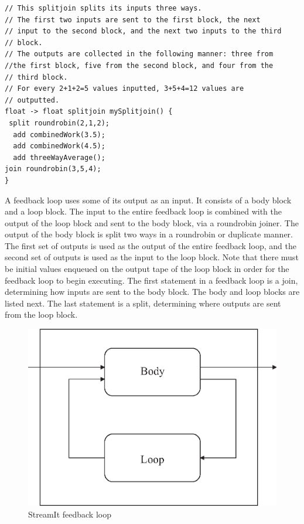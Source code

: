 \begin{scriptsize}
\begin{verbatim}
// This splitjoin splits its inputs three ways.
// The first two inputs are sent to the first block, the next
// input to the second block, and the next two inputs to the third
// block.
// The outputs are collected in the following manner: three from
//the first block, five from the second block, and four from the
// third block.
// For every 2+1+2=5 values inputted, 3+5+4=12 values are
// outputted.
float -> float splitjoin mySplitjoin() {
 split roundrobin(2,1,2);
  add combinedWork(3.5);
  add combinedWork(4.5);
  add threeWayAverage();
join roundrobin(3,5,4);
}
\end{verbatim}
\end{scriptsize}

    A feedback loop uses some of its output as
an input. It consists of a body block and a loop block. The input
to the entire feedback loop is combined with the output of the
loop block and sent to the body block, via a roundrobin joiner.
The output of the body block is split two ways in a roundrobin or
duplicate manner.  The first set of outputs is used as the output
of the entire feedback loop, and the second set of outputs is used
as the input to the loop block. Note that there must be initial
values enqueued on the output tape of the loop block in order for
the feedback loop to begin executing. The first statement in a
feedback loop is a join, determining how inputs are sent to the
body block. The body and loop blocks are listed next. The last
statement is a split, determining where outputs are sent from the
loop block.

\begin{figure}[bthp]
  \centering
  \includegraphics[width=6.0in]{figures/feedback.eps}
  \caption{StreamIt feedback loop}
  \label{fig:feedback}
\end{figure}

